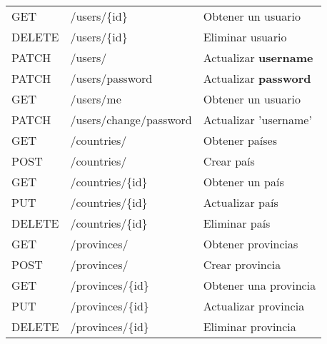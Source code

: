 \begin{table}[H]
\begin{tabular}{l l l}
        GET             & /users/\{id\}          & Obtener un usuario           \\
        DELETE          & /users/\{id\}          & Eliminar usuario             \\
        PATCH           & /users/                & Actualizar \textbf{username} \\
        PATCH           & /users/password        & Actualizar \textbf{password} \\
        GET             & /users/me              & Obtener un usuario           \\
        PATCH           & /users/change/password & Actualizar 'username'        \\

        \midrule
        GET             & /countries/            & Obtener países               \\
        POST            & /countries/            & Crear país                   \\
        GET             & /countries/\{id\}      & Obtener un país              \\
        PUT             & /countries/\{id\}      & Actualizar país              \\
        DELETE          & /countries/\{id\}      & Eliminar país                \\
        \midrule
        GET             & /provinces/            & Obtener provincias           \\
        POST            & /provinces/            & Crear provincia              \\
        GET             & /provinces/\{id\}      & Obtener una provincia        \\
        PUT             & /provinces/\{id\}      & Actualizar provincia         \\
        DELETE          & /provinces/\{id\}      & Eliminar provincia           \\
        \bottomrule
        \hline
    \end{tabular}
    \label{tab:endpoints1}
\end{table}

